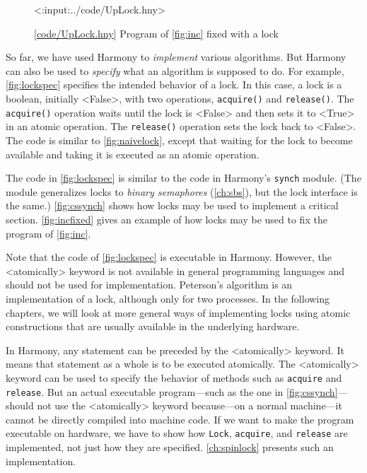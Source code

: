 \documentclass{report}
\newcommand{\harmonylink}[1]{%
[\href{https://harmony.cs.cornell.edu/#1}{\underline{#1}}]%
}
\newenvironment{code}{
\tcolorbox
}{
\endtcolorbox
}
\begin{document}
\begin{figure}
\begin{code}
<{:input:../code/UpLock.hny}>
\end{code}
\caption{\harmonylink{code/UpLock.hny} Program of \autoref{fig:inc} fixed with a lock}
\label{fig:incfixed}
\end{figure}

So far, we have used Harmony to \emph{implement} various algorithms.
But Harmony can also be used to \emph{specify} what an algorithm is
supposed to do.
For example, \autoref{fig:lockspec} specifies the intended behavior
of a lock.
In this case, a lock is a boolean, initially <{False}>,
with two operations, \texttt{acquire()} and \texttt{release()}.
The \texttt{acquire()} operation waits until the lock is <{False}>
and then sets it to <{True}> in an atomic operation.
The \texttt{release()} operation sets the lock back to <{False}>.
The code is similar to \autoref{fig:naivelock}, except that waiting
for the lock to become available and taking it is executed as an
atomic operation.

The code in \autoref{fig:lockspec} is similar to the code in
Harmony's \texttt{synch} module.
(The module generalizes locks to \emph{binary semaphores}
(\autoref{ch:sbs}), but the lock interface is the same.)
\autoref{fig:cssynch} shows how locks may be used to implement
a critical section.
\autoref{fig:incfixed} gives an example of how locks may be used
to fix the program of \autoref{fig:inc}.

Note that the code of \autoref{fig:lockspec} is executable in Harmony.
However, the <{atomically}> keyword is not available in general
programming languages and should not be used for implementation.
Peterson's algorithm is an implementation of a lock, although only for
two processes.  In the following chapters, we will look at more general
ways of implementing locks using atomic constructions that are usually
available in the underlying hardware.

In Harmony, any statement can be preceded by the <{atomically}>
keyword.  It means that statement as a whole is to be executed atomically.
The <{atomically}> keyword can be used to specify the behavior of
methods such as \texttt{acquire} and \texttt{release}.  But
an actual executable program---such as the one in
\autoref{fig:cssynch}---should not use the <{atomically}> keyword
because---on a normal machine---it cannot be directly compiled into
machine code.
If we want to make the program executable on hardware,
we have to show how \texttt{Lock}, \texttt{acquire}, and \texttt{release}
are implemented, not just how they are specified.
\autoref{ch:spinlock} presents such an implementation.
\end{document}
